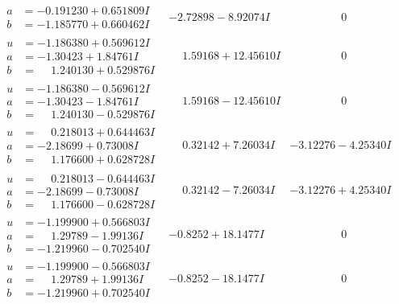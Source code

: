 \documentclass[1p]{elsarticle_modified}
\theoremstyle{definition}
\begin{document}
$$\begin{array}{c|c|c}
\begin{aligned}
a &= -0.191230 + 0.651809 I \\
b &= -1.185770 + 0.660462 I\end{aligned}
 & -2.72898 - 8.92074 I & \phantom{-0.000000 } 0 \\ \hline\begin{aligned}
u &= -1.186380 + 0.569612 I \\
a &= -1.30423 + 1.84761 I \\
b &= \phantom{-}1.240130 + 0.529876 I\end{aligned}
 & \phantom{-}1.59168 + 12.45610 I & \phantom{-0.000000 } 0 \\ \hline\begin{aligned}
u &= -1.186380 - 0.569612 I \\
a &= -1.30423 - 1.84761 I \\
b &= \phantom{-}1.240130 - 0.529876 I\end{aligned}
 & \phantom{-}1.59168 - 12.45610 I & \phantom{-0.000000 } 0 \\ \hline\begin{aligned}
u &= \phantom{-}0.218013 + 0.644463 I \\
a &= -2.18699 + 0.73008 I \\
b &= \phantom{-}1.176600 + 0.628728 I\end{aligned}
 & \phantom{-}0.32142 + 7.26034 I & -3.12276 - 4.25340 I \\ \hline\begin{aligned}
u &= \phantom{-}0.218013 - 0.644463 I \\
a &= -2.18699 - 0.73008 I \\
b &= \phantom{-}1.176600 - 0.628728 I\end{aligned}
 & \phantom{-}0.32142 - 7.26034 I & -3.12276 + 4.25340 I \\ \hline\begin{aligned}
u &= -1.199900 + 0.566803 I \\
a &= \phantom{-}1.29789 - 1.99136 I \\
b &= -1.219960 - 0.702540 I\end{aligned}
 & -0.8252 + 18.1477 I & \phantom{-0.000000 } 0 \\ \hline\begin{aligned}
u &= -1.199900 - 0.566803 I \\
a &= \phantom{-}1.29789 + 1.99136 I \\
b &= -1.219960 + 0.702540 I\end{aligned}
 & -0.8252 - 18.1477 I & \phantom{-0.000000 } 0 \\ \hline\begin{aligned}

\end{aligned}
\end{array}$$
\end{document}
